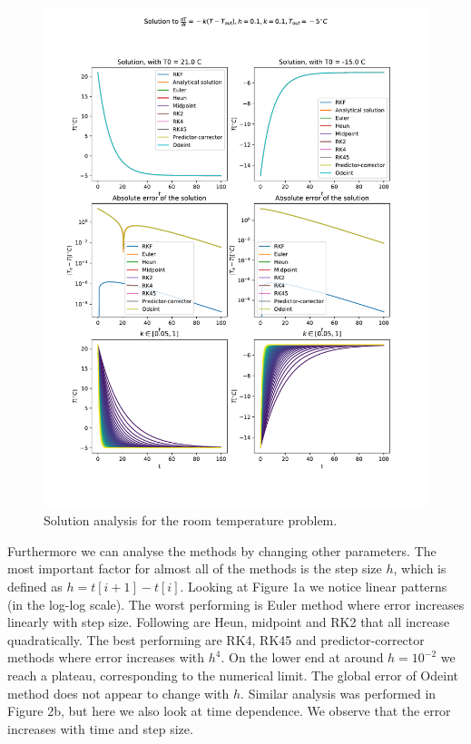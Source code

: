 \documentclass[12pt, a4paper]{article}
\begin{document}
\begin{figure}[hbtp]
  \begin{center}
  \includegraphics[width=13cm]{graphs/solution.pdf}
  \end{center}
  \vspace*{-7mm}
  \caption{Solution analysis for the room temperature problem.}
\end{figure}

Furthermore we can analyse the methods by changing other parameters. The most important factor for almost all of the methods is the step size $h$, which is defined as $h = t[i+1] - t[i]$. Looking at Figure 1a we notice linear patterns (in the log-log scale). The worst performing is Euler method where error increases linearly with step size. Following are Heun, midpoint and RK2 that all increase quadratically. The best performing are RK4, RK45 and predictor-corrector methods where error increases with $h^4$. On the lower end at around $h = 10^{-2}$ we reach a plateau, corresponding to the numerical limit. The global error of Odeint method does not appear to change with $h$. Similar analysis was performed in Figure 2b, but here we also look at time dependence. We observe that the error increases with time and step size.
\end{document}
